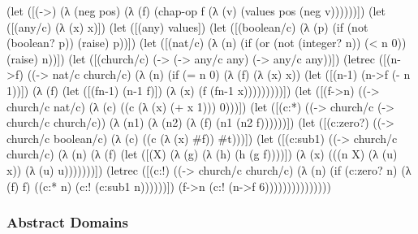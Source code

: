 \begin{schemedisplay}
(let ([(->) (λ (neg pos) (λ (f) (chap-op f (λ (v) (values pos (neg v))))))])
  (let ([(any/c) (λ (x) x)])
    (let ([(any) values])
      (let ([(boolean/c) (λ (p)
                           (if (not (boolean? p))
                               (raise)
                               p))])
        (let ([(nat/c) (λ (n)
                         (if (or (not (integer? n))
                                 (< n 0))
                             (raise)
                             n))])
          (let ([(church/c) (-> (-> any/c any)
                                (-> any/c any))])
            (letrec ([(n->f) ((-> nat/c church/c)
                              (λ (n)
                                (if (= n 0)
                                    (λ (f) (λ (x) x))
                                    (let ([(n-1) (n->f (- n 1))])
                                      (λ (f)
                                        (let ([(fn-1) (n-1 f)])
                                          (λ (x) (f (fn-1 x)))))))))])
              (let ([(f->n) ((-> church/c nat/c)
                             (λ (c)
                               ((c (λ (x) (+ x 1))) 0)))])
                (let ([(c:*) ((-> church/c (-> church/c church/c))
                              (λ (n1)
                                (λ (n2)
                                  (λ (f)
                                    (n1 (n2 f))))))])
                  (let ([(c:zero?) ((-> church/c boolean/c)
                                    (λ (c) ((c (λ (x) #f)) #t)))])
                    (let ([(c:sub1) ((-> church/c church/c)
                                     (λ (n)
                                       (λ (f)
                                         (let ([(X) (λ (g) (λ (h) (h (g f))))])
                                           (λ (x)
                                             (((n X)
                                               (λ (u) x))
                                              (λ (u) u)))))))])
                      (letrec ([(c:!) ((-> church/c church/c)
                                       (λ (n)
                                         (if (c:zero? n)
                                             (λ (f) f)
                                             ((c:* n) (c:! (c:sub1 n))))))])
                        (f->n (c:! (n->f 6)))))))))))))))
\end{schemedisplay}

\subsubsection{Abstract Domains}

